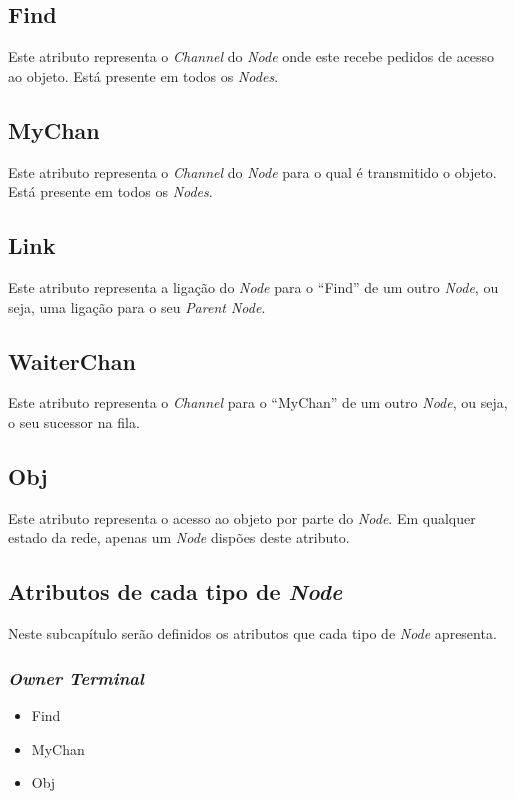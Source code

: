 \subsection*{Find}
\label{especificacao:atr:Find}
    Este atributo representa o \emph{Channel} do \emph{Node} onde este recebe pedidos de acesso ao objeto.
    Está presente em todos os \emph{Nodes}.

\subsection*{MyChan}
\label{especificacao:atr:mychan}
    Este atributo representa o \emph{Channel} do \emph{Node} para o qual é transmitido o objeto.
    Está presente em todos os \emph{Nodes}.

\subsection*{Link}
\label{especificacao:atr:link}
Este atributo representa a ligação do \emph{Node} para o ``Find'' de um outro \emph{Node}, ou seja, uma ligação para o seu \emph{Parent Node}.

\subsection*{WaiterChan}
\label{especificacao:atr:waiterchan}
    Este atributo representa o \emph{Channel} para o ``MyChan'' de um outro \emph{Node}, ou seja, o seu sucessor na fila.

\subsection*{Obj}
\label{especificacao:atr:obj}
    Este atributo representa o acesso ao objeto por parte do \emph{Node}.
    Em qualquer estado da rede, apenas um \emph{Node} dispões deste atributo.


\subsection*{Atributos de cada tipo de \emph{Node}}
Neste subcapítulo serão definidos os atributos que cada tipo de \emph{Node} apresenta.


\subsubsection*{\emph{Owner Terminal}}
\begin{itemize}
    \item Find
    \item MyChan
    \item Obj
\end{itemize}
